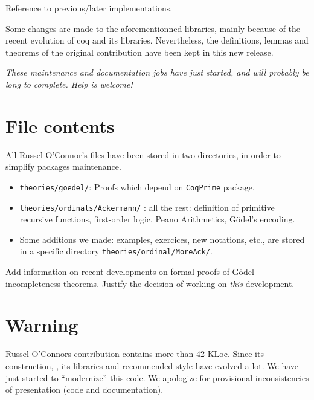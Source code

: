 \begin{todo}
Reference to previous/later implementations.
\end{todo}


Some changes are made to the aforementionned libraries, mainly because of the recent evolution of coq and its libraries. Nevertheless, the definitions, lemmas and theorems of the original contribution have been kept in this new release.

\emph{\color{red!80}These maintenance and documentation 
jobs have just started, and will probably be long to complete. Help is welcome!}

\section{File contents}

All Russel O'Connor's files have been stored in two directories, in order to simplify packages maintenance. 

\begin{itemize}
\item \texttt{theories/goedel/}: Proofs which depend on 
\texttt{CoqPrime} package.
\item  \texttt{theories/ordinals/Ackermann/} : all the rest:
 definition of primitive recursive functions, first-order  logic,
Peano Arithmetics, G\"{o}del's encoding.
\item Some additions we made: examples, exercices, new notations, etc.,  are stored in a specific directory \texttt{theories/ordinal/MoreAck/}.
\end{itemize}


\begin{todo}
Add information on recent developments on formal 
proofs of G\"odel  incompleteness theorems. Justify the decision of working on \emph{this} development.  
\end{todo}

\section{Warning}
Russel O'Connors contribution contains more than 42 KLoc.
Since its construction, \coq{},  its libraries and recommended style have evolved a lot. We have just started to ``modernize'' this code. We apologize for provisional inconsistencies of presentation (code and documentation).

